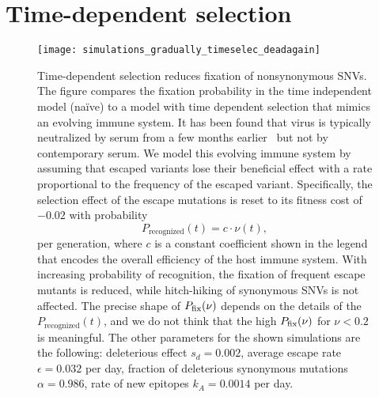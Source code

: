 
\section{Time-dependent selection}
\begin{figure}[h]
\begin{center}
\texttt{[image: simulations\_gradually\_timeselec\_deadagain]}
\caption{
Time-dependent selection reduces fixation of nonsynonymous SNVs. The figure
compares the fixation probability in the time independent model (na\"ive) to
a model with time dependent selection that mimics  an evolving immune system.
It has been found that virus is typically neutralized by serum from a few months
earlier~\citep{richman_rapid_2003} but not by contemporary serum. We model this
evolving immune system by assuming that escaped variants lose their beneficial
effect with a rate proportional to the frequency of the escaped variant. 
Specifically, the selection effect of the escape mutations is
reset to its fitness cost of $-0.02$ with probability
\[ P_\text{recognized}(t) = c \cdot \nu(t), \] 
per generation, where $c$ is a constant coefficient shown in the legend that
encodes the overall efficiency of the host immune system. With increasing
probability of recognition, the fixation of frequent escape mutants is reduced,
while hitch-hiking of synonymous SNVs is not affected. The precise
shape of $P_{\mathrm{fix}}(\nu)$ depends on the details of the $P_\text{recognized}(t)$, and 
we do not think that the high $P_{\mathrm{fix}}(\nu)$ for $\nu<0.2$ is meaningful.
The other parameters for the shown simulations are
the following: deleterious effect $s_d = 0.002$, average escape rate $\epsilon
= 0.032$ per day, fraction of deleterious synonymous mutations $\alpha = 0.986$, rate of new epitopes
$k_A=0.0014$ per day.
}
\label{fig:tds}
\end{center}
\end{figure}

